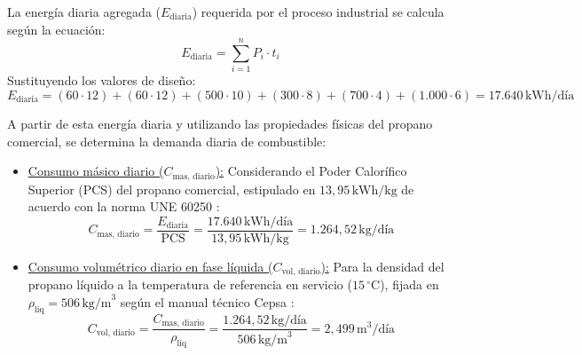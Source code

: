 \documentclass[12pt]{article}
\begin{document}
        La energía diaria agregada ($E_{\text{diaria}}$) requerida por el proceso industrial se calcula según la ecuación:
        \begin{equation}
            E_{\text{diaria}} = \sum_{i=1}^{n} P_i \cdot t_i
        \end{equation}
        Sustituyendo los valores de diseño:
        \begin{equation}
            E_{\text{diaria}} = (60 \cdot 12) + (60 \cdot 12) + (500 \cdot 10) + (300 \cdot 8) + (700 \cdot 4) + (1.000 \cdot 6) = 17.640\,\text{kWh/día}
        \end{equation}

        A partir de esta energía diaria y utilizando las propiedades físicas del propano comercial, se determina la demanda diaria de combustible:
        \begin{itemize}
            \item \underline{Consumo másico diario ($C_{\text{mas, diario}}$):}
            Considerando el Poder Calorífico Superior (PCS) del propano comercial, estipulado en $13,95\,\text{kWh/kg}$ de acuerdo con la norma UNE 60250 \cite{une60250}:
            \begin{equation}
                C_{\text{mas, diario}} = \frac{E_{\text{diaria}}}{\text{PCS}} = \frac{17.640\,\text{kWh/día}}{13,95\,\text{kWh/kg}} = 1.264,52\,\text{kg/día}
            \end{equation}
            
            \item \underline{Consumo volumétrico diario en fase líquida ($C_{\text{vol, diario}}$):}
            Para la densidad del propano líquido a la temperatura de referencia en servicio ($15\,^{\circ}\text{C}$), fijada en $\rho_{\text{liq}} = 506\,\text{kg/m}^3$ según el manual técnico Cepsa \cite{cepsamanual}:
            \begin{equation}
                C_{\text{vol, diario}} = \frac{C_{\text{mas, diario}}}{\rho_{\text{liq}}} = \frac{1.264,52\,\text{kg/día}}{506\,\text{kg/m}^3} = 2,499\,\text{m}^3/\text{día}
            \end{equation}
        \end{itemize}
\end{document}
